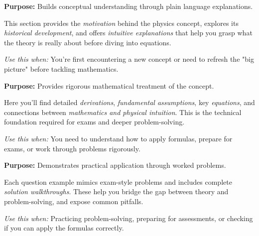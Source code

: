 \documentclass[12pt, a4paper, openright]{report}
\begin{document}
\noindent
\begin{minipage}{0.9\textwidth}
  \begin{tcolorbox}[breakable, colback=GoldBG, colframe=StarGold, 
                     leftrule=4pt, arc=0pt,
                     before upper={\textcolor{StarGold}{\textbf{\scshape Physics Intuition}}\par\smallskip}]
    \textbf{Purpose:} Builds conceptual understanding through plain language explanations.
    
    This section provides the \emph{motivation} behind the physics concept, 
    explores its \emph{historical development}, and offers \emph{intuitive explanations} 
    that help you grasp what the theory is really about before diving into equations.
    
    \smallskip
    \textit{Use this when:} You're first encountering a new concept or need to refresh 
    the "big picture" before tackling mathematics.
  \end{tcolorbox}
\end{minipage}

\bigskip

\noindent
\begin{minipage}{0.9\textwidth}
  \begin{tcolorbox}[breakable, colback=TealBG, colframe=NebulaTeal, 
                     leftrule=4pt, arc=0pt,
                     before upper={\textcolor{NebulaTeal}{\textbf{\scshape Theory}}\par\smallskip}]
    \textbf{Purpose:} Provides rigorous mathematical treatment of the concept.
    
    Here you'll find detailed \emph{derivations}, \emph{fundamental assumptions}, 
    key \emph{equations}, and connections between \emph{mathematics and physical intuition}. 
    This is the technical foundation required for exams and deeper problem-solving.
    
    \smallskip
    \textit{Use this when:} You need to understand how to apply formulas, prepare for exams, 
    or work through problems rigorously.
  \end{tcolorbox}
\end{minipage}

\bigskip

\noindent
\begin{minipage}{0.9\textwidth}
  \begin{tcolorbox}[breakable, colback=GreenBG, colframe=ForestGreen, 
                     arc=3pt,
                     before upper={\textcolor{ForestGreen}{\textbf{\scshape Question Examples}}\par\smallskip}]
    \textbf{Purpose:} Demonstrates practical application through worked problems.
    
    Each question example mimics exam-style problems and includes complete 
    \emph{solution walkthroughs}. These help you bridge the gap between theory 
    and problem-solving, and expose common pitfalls.
    
    \smallskip
    \textit{Use this when:} Practicing problem-solving, preparing for assessments, 
    or checking if you can apply the formulas correctly.
  \end{tcolorbox}
\end{minipage}
\end{document}
